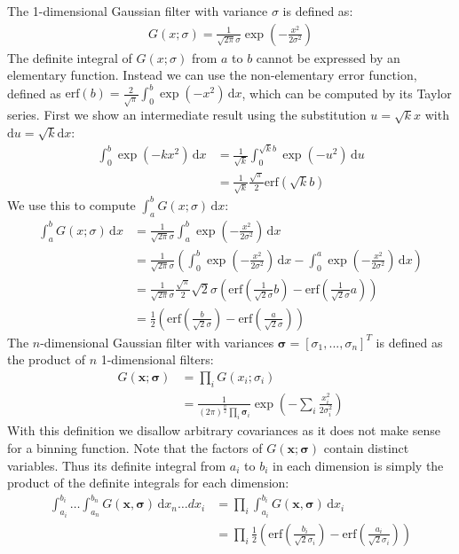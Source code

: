 \documentclass[thesis.tex]{subfiles}
\begin{document}
The 1-dimensional Gaussian filter with variance $\sigma$ is defined as:
%
\begin{align}
G(x;\sigma) = \frac{1}{\sqrt{2\pi} \sigma}
\exp\left( -\frac{x^2}{2 \sigma^2} \right)
\end{align}
%
The definite integral of $G(x;\sigma)$ from $a$ to $b$ cannot be expressed by an elementary function. Instead we can use the non-elementary error function, defined as $\mathrm{erf}(b) = \frac{2}{\sqrt{\pi}} \int_0^b \exp(-x^2) \,\mathrm dx$, which can be computed by its Taylor series. First we show an intermediate result using the substitution $u = \sqrt{k} x$ with $\mathrm du = \sqrt{k} \mathrm dx$:
%
\begin{align}
\int_0^b \exp(-k x^2) \,\mathrm dx
&= \frac{1}{\sqrt{k}} \int_0^{\sqrt{k}b} \exp(-u^2) \,\mathrm du \\
&= \frac{1}{\sqrt{k}} \frac{\sqrt{\pi}}{2} \mathrm{erf} \left( \sqrt{k} b \right)
\end{align}
%
We use this to compute $\int_a^b G(x;\sigma) \,\mathrm dx$:
%
\begin{align}
\int_a^b G(x;\sigma) \,\mathrm dx
&= \frac{1}{\sqrt{2\pi} \sigma} \int_a^b \exp\left( -\frac{x^2}{2 \sigma^2} \right) \,\mathrm dx \\
&= \frac{1}{\sqrt{2\pi} \sigma} \left( \int_0^b \exp\left( -\frac{x^2}{2 \sigma^2} \right) \,\mathrm dx - \int_0^a \exp\left( -\frac{x^2}{2 \sigma^2} \right) \,\mathrm dx \right) \\
&= \frac{1}{\sqrt{2\pi} \sigma} \frac{\sqrt{\pi}}{2} \sqrt{2} \sigma \left(
\mathrm{erf} \left( \frac{1}{\sqrt{2} \sigma} b \right) -
\mathrm{erf} \left( \frac{1}{\sqrt{2} \sigma} a \right) \right) \\
&= \frac{1}{2} \left(
\mathrm{erf} \left( \frac{b}{\sqrt{2} \sigma} \right) -
\mathrm{erf} \left( \frac{a}{\sqrt{2} \sigma} \right)
\right)
\end{align}
%
The $n$-dimensional Gaussian filter with variances $\boldsymbol{\sigma} = [\sigma_1, ..., \sigma_n]^T$ is defined as the product of $n$ 1-dimensional filters:
%
\begin{align}
G(\mathbf{x};\boldsymbol{\sigma})
&= \prod_i G(x_i;\sigma_i) \\
&= \frac{1}{(2\pi)^\frac{n}{2} \prod_i \mathbf{\sigma}_i}
\exp\left( -\sum_i \frac{x_i^2}{2 \sigma_i^2} \right)
\end{align}
%
With this definition we disallow arbitrary covariances as it does not make sense for a binning function. Note that the factors of $G(\mathbf{x};\boldsymbol{\sigma})$ contain distinct variables. Thus its definite integral from $a_i$ to $b_i$ in each dimension is simply the product of the definite integrals for each dimension:
%
\begin{align}
\int_{a_i}^{b_i} \dots \int_{a_n}^{b_n} G(\mathbf{x},\boldsymbol{\sigma}) \,\mathrm d{x_n} \dots d{x_i}
&= \prod_i \int_{a_i}^{b_i} G(\mathbf{x},\boldsymbol{\sigma}) \,\mathrm d{x_i} \\
&= \prod_i \frac{1}{2} \left(
\mathrm{erf} \left( \frac{b_i}{\sqrt{2} \sigma_i} \right) -
\mathrm{erf} \left( \frac{a_i}{\sqrt{2} \sigma_i} \right)
\right)
\end{align}
%
\end{document}
